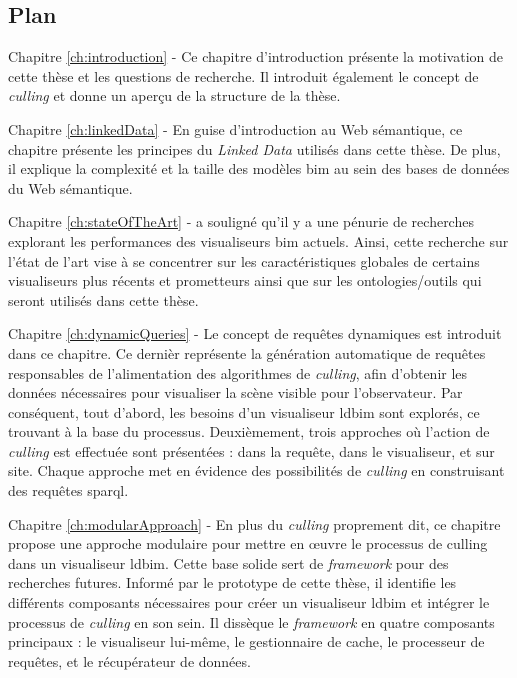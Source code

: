 \begin{refsection}
\begin{multicols}{2}
        \subsection*{Plan}
        \textsf{Chapitre \ref{ch:introduction} -}
        Ce chapitre d'introduction présente la motivation de cette thèse et les questions de recherche. Il introduit également le concept de \emph{culling} et donne un aperçu de la structure de la thèse.

        \textsf{Chapitre \ref{ch:linkedData} -}
        En guise d'introduction au Web sémantique, ce chapitre présente les principes du \emph{Linked Data} utilisés dans cette thèse. De plus, il explique la complexité et la taille des modèles \ac{bim} au sein des bases de données du Web sémantique.

        \textsf{Chapitre \ref{ch:stateOfTheArt} -}
        \cite{Johansson2015} a souligné qu'il y a une pénurie de recherches explorant les performances des visualiseurs \ac{bim} actuels. Ainsi, cette recherche sur l'état de l'art vise à se concentrer sur les caractéristiques globales de certains visualiseurs plus récents et prometteurs ainsi que sur les ontologies/outils qui seront utilisés dans cette thèse.

        \textsf{Chapitre \ref{ch:dynamicQueries} -}
        Le concept de requêtes dynamiques est introduit dans ce chapitre. Ce dernièr représente la génération automatique de requêtes responsables de l'alimentation des algorithmes de \emph{culling}, afin d'obtenir les données nécessaires pour visualiser la scène visible pour l'observateur. Par conséquent, tout d'abord, les besoins d'un visualiseur \ac{ldbim} sont explorés, ce trouvant à la base du processus. Deuxièmement, trois approches où l'action de \emph{culling} est effectuée sont présentées : dans la requête, dans le visualiseur, et sur site. Chaque approche met en évidence des possibilités de \emph{culling} en construisant des requêtes \ac{sparql}.

        \textsf{Chapitre \ref{ch:modularApproach} -}
        En plus du \emph{culling} proprement dit, ce chapitre propose une approche modulaire pour mettre en œuvre le processus de culling dans un visualiseur \ac{ldbim}. Cette base solide sert de \emph{framework} pour des recherches futures. Informé par le prototype de cette thèse, il identifie les différents composants nécessaires pour créer un visualiseur \ac{ldbim} et intégrer le processus de \emph{culling} en son sein. Il dissèque le \emph{framework} en quatre composants principaux : le visualiseur lui-même, le gestionnaire de cache, le processeur de requêtes, et le récupérateur de données.


\end{multicols}
\end{refsection}

